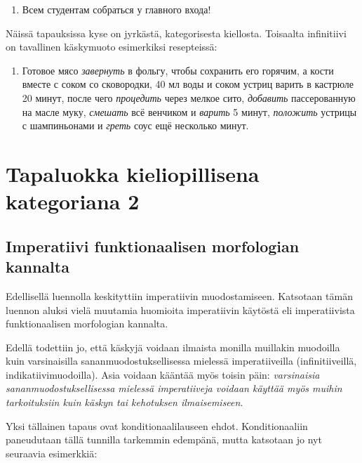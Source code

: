 \documentclass[]{scrreprt}
\providecommand{\tightlist}{%
  \setlength{\itemsep}{0pt}\setlength{\parskip}{0pt}}
\begin{document}
\begin{enumerate}
\def\labelenumi{(\arabic{enumi})}
\setcounter{enumi}{360}
\tightlist
\item
  Всем студентам собраться у главного входа!
\end{enumerate}

Näissä tapauksissa kyse on jyrkästä, kategorisesta kiellosta. Toisaalta
infinitiivi on tavallinen käskymuoto esimerkiksi resepteissä:

\begin{enumerate}
\def\labelenumi{(\arabic{enumi})}
\setcounter{enumi}{361}
\tightlist
\item
  Готовое мясо \emph{завернуть} в фольгу, чтобы сохранить его горячим, а
  кости вместе с соком со сковородки, 40 мл воды и соком устриц варить в
  кастрюле 20 минут, после чего \emph{процедить} через мелкое сито,
  \emph{добавить} пассерованную на масле муку, \emph{смешать} всё
  венчиком и \emph{варить} 5 минут, \emph{положить} устрицы с
  шампиньонами и \emph{греть} соус ещё несколько минут.
\end{enumerate}

\chapter{Tapaluokka kieliopillisena kategoriana
2}\label{luento-19-tapaluokka-kieliopillisena-kategoriana-2}


\section{Imperatiivi funktionaalisen morfologian
kannalta}\label{imperatiivi-funktionaalisen-morfologian-kannalta}

Edellisellä luennolla keskityttiin imperatiivin muodostamiseen.
Katsotaan tämän luennon aluksi vielä muutamia huomioita imperatiivin
käytöstä eli imperatiivista funktionaalisen morfologian kannalta.

Edellä todettiin jo, että käskyjä voidaan ilmaista monilla muillakin
muodoilla kuin varsinaisilla sananmuodostuksellisessa mielessä
imperatiiveilla (infinitiiveillä, indikatiivimuodoilla). Asia voidaan
kääntää myös toisin päin: \emph{varsinaisia sananmuodostuksellisessa
mielessä imperatiiveja voidaan käyttää myös muihin tarkoituksiin kuin
käskyn tai kehotuksen ilmaisemiseen}.

Yksi tällainen tapaus ovat konditionaalilauseen ehdot. Konditionaaliin
paneudutaan tällä tunnilla tarkemmin edempänä, mutta katsotaan jo nyt
seuraavia esimerkkiä:
\end{document}
